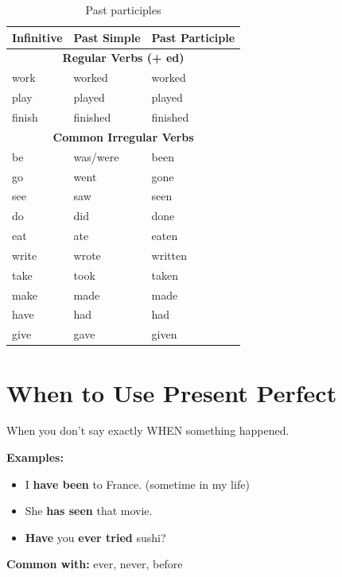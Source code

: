 \begin{table}[h]
\centering
\begin{tabular}{|l|l|l|}
\hline
\textbf{Infinitive} & \textbf{Past Simple} & \textbf{Past Participle} \\
\hline
\multicolumn{3}{|c|}{\textbf{Regular Verbs (+ ed)}} \\
\hline
work & worked & worked \\
\hline
play & played & played \\
\hline
finish & finished & finished \\
\hline
\multicolumn{3}{|c|}{\textbf{Common Irregular Verbs}} \\
\hline
be & was/were & been \\
\hline
go & went & gone \\
\hline
see & saw & seen \\
\hline
do & did & done \\
\hline
eat & ate & eaten \\
\hline
write & wrote & written \\
\hline
take & took & taken \\
\hline
make & made & made \\
\hline
have & had & had \\
\hline
give & gave & given \\
\hline
\end{tabular}
\caption{Past participles}
\end{table}

\section{When to Use Present Perfect}

\begin{grammarbox}[title=Use 1: Life Experiences (Unspecified Time)]
When you don't say exactly WHEN something happened.

\textbf{Examples:}
\begin{itemize}
    \item I \textbf{have been} to France.  (sometime in my life)
    \item She \textbf{has seen} that movie. 
    \item \textbf{Have} you \textbf{ever tried} sushi? 
\end{itemize}

\textbf{Common with:} ever, never, before
\end{grammarbox}


